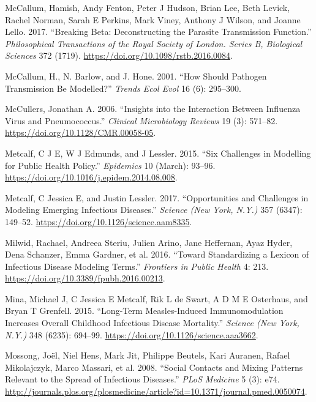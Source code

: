 \documentclass[
]{book}
\begin{document}
\leavevmode\hypertarget{ref-mccallum17}{}%
McCallum, Hamish, Andy Fenton, Peter J Hudson, Brian Lee, Beth Levick, Rachel Norman, Sarah E Perkins, Mark Viney, Anthony J Wilson, and Joanne Lello. 2017. ``Breaking Beta: Deconstructing the Parasite Transmission Function.'' \emph{Philosophical Transactions of the Royal Society of London. Series B, Biological Sciences} 372 (1719). \url{https://doi.org/10.1098/rstb.2016.0084}.

\leavevmode\hypertarget{ref-mccallum01}{}%
McCallum, H., N. Barlow, and J. Hone. 2001. ``How Should Pathogen Transmission Be Modelled?'' \emph{Trends Ecol Evol} 16 (6): 295--300.

\leavevmode\hypertarget{ref-mccullers06}{}%
McCullers, Jonathan A. 2006. ``Insights into the Interaction Between Influenza Virus and Pneumococcus.'' \emph{Clinical Microbiology Reviews} 19 (3): 571--82. \url{https://doi.org/10.1128/CMR.00058-05}.

\leavevmode\hypertarget{ref-metcalf15}{}%
Metcalf, C J E, W J Edmunds, and J Lessler. 2015. ``Six Challenges in Modelling for Public Health Policy.'' \emph{Epidemics} 10 (March): 93--96. \url{https://doi.org/10.1016/j.epidem.2014.08.008}.

\leavevmode\hypertarget{ref-metcalf17}{}%
Metcalf, C Jessica E, and Justin Lessler. 2017. ``Opportunities and Challenges in Modeling Emerging Infectious Diseases.'' \emph{Science (New York, N.Y.)} 357 (6347): 149--52. \url{https://doi.org/10.1126/science.aam8335}.

\leavevmode\hypertarget{ref-milwid16}{}%
Milwid, Rachael, Andreea Steriu, Julien Arino, Jane Heffernan, Ayaz Hyder, Dena Schanzer, Emma Gardner, et al. 2016. ``Toward Standardizing a Lexicon of Infectious Disease Modeling Terms.'' \emph{Frontiers in Public Health} 4: 213. \url{https://doi.org/10.3389/fpubh.2016.00213}.

\leavevmode\hypertarget{ref-mina15}{}%
Mina, Michael J, C Jessica E Metcalf, Rik L de Swart, A D M E Osterhaus, and Bryan T Grenfell. 2015. ``Long-Term Measles-Induced Immunomodulation Increases Overall Childhood Infectious Disease Mortality.'' \emph{Science (New York, N.Y.)} 348 (6235): 694--99. \url{https://doi.org/10.1126/science.aaa3662}.

\leavevmode\hypertarget{ref-mossong08}{}%
Mossong, Joël, Niel Hens, Mark Jit, Philippe Beutels, Kari Auranen, Rafael Mikolajczyk, Marco Massari, et al. 2008. ``Social Contacts and Mixing Patterns Relevant to the Spread of Infectious Diseases.'' \emph{PLoS Medicine} 5 (3): e74. \url{http://journals.plos.org/plosmedicine/article?id=10.1371/journal.pmed.0050074}.
\end{document}
